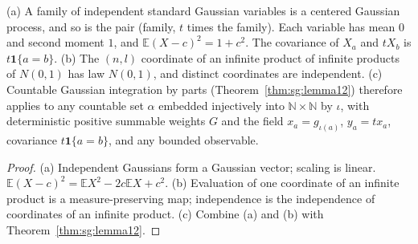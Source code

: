 \begin{lemma}\label{lem:sg:pd-gaussian-array}
  \leanok
  (a) A family of independent standard Gaussian variables is a centered Gaussian process, and so is the pair (family, $t$ times the family). Each variable has mean $0$ and second moment $1$, and $\mathbb E(X-c)^2=1+c^2$. The covariance of $X_a$ and $tX_b$ is $t\mathbf1\{a=b\}$. (b) The $(n,l)$ coordinate of an infinite product of infinite products of $N(0,1)$ has law $N(0,1)$, and distinct coordinates are independent. (c) Countable Gaussian integration by parts (Theorem~\ref{thm:sg:lemma12}) therefore applies to any countable set $\alpha$ embedded injectively into $\mathbb N\times\mathbb N$ by $\iota$, with deterministic positive summable weights $G$ and the field $x_a=g_{\iota(a)}$, $y_a=tx_a$, covariance $t\mathbf1\{a=b\}$, and any bounded observable.
\end{lemma}

\begin{proof}
  \leanok
(a) Independent Gaussians form a Gaussian vector; scaling is linear. $\mathbb E(X-c)^2=\mathbb EX^2-2c\mathbb EX+c^2$. (b) Evaluation of one coordinate of an infinite product is a measure-preserving map; independence is the independence of coordinates of an infinite product. (c) Combine (a) and (b) with Theorem~\ref{thm:sg:lemma12}.
\end{proof}

